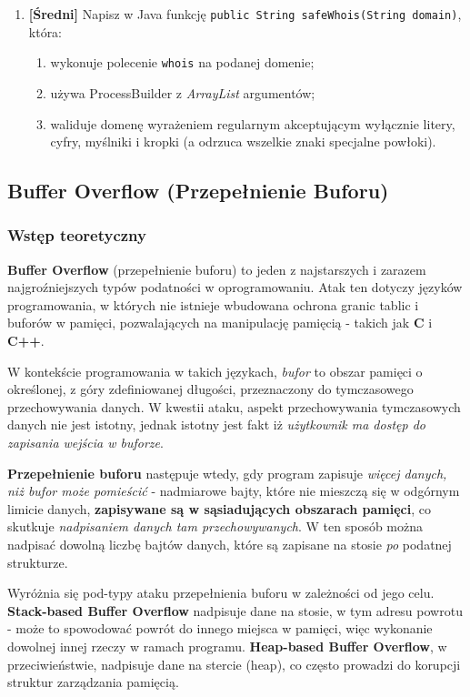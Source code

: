 \documentclass[12pt,a4paper]{article}
\begin{document}
\begin{enumerate}
    \item \textbf{[Średni]} Napisz w Java funkcję
    \texttt{public String safeWhois(String domain)}, która:
    \begin{enumerate}
        \item wykonuje polecenie \texttt{whois} na podanej domenie;
        \item używa ProcessBuilder z \emph{ArrayList} argumentów;
        \item waliduje domenę wyrażeniem regularnym akceptującym wyłącznie litery, cyfry, myślniki i kropki (a odrzuca wszelkie znaki specjalne powłoki).
    \end{enumerate}
 
\end{enumerate}



\subsection{Buffer Overflow (Przepełnienie Buforu)}

\subsubsection{Wstęp teoretyczny}

\textbf{Buffer Overflow} (przepełnienie buforu) to jeden z najstarszych i zarazem najgroźniejszych typów podatności w oprogramowaniu. Atak ten dotyczy języków programowania, w których nie istnieje wbudowana
ochrona granic tablic i buforów w pamięci, pozwalających na manipulację pamięcią - takich jak \textbf{C} i \textbf{C++}.

W kontekście programowania w takich językach, \emph{bufor} to obszar pamięci o określonej, z góry zdefiniowanej długości, przeznaczony do tymczasowego przechowywania danych. W kwestii ataku, aspekt przechowywania
tymczasowych danych nie jest istotny, jednak istotny jest fakt iż \emph{użytkownik ma dostęp do zapisania wejścia w buforze}. 

\textbf{Przepełnienie buforu} następuje wtedy, gdy program zapisuje \emph{więcej danych, niż bufor może pomieścić} - nadmiarowe bajty, które nie mieszczą się w odgórnym limicie danych, 
\textbf{zapisywane są w sąsiadujących obszarach pamięci}, co skutkuje \emph{nadpisaniem danych tam przechowywanych}. W ten sposób można nadpisać dowolną liczbę bajtów danych, które są zapisane na stosie 
\emph{po} podatnej strukturze.

Wyróżnia się pod-typy ataku przepełnienia buforu w zależności od jego celu. \textbf{Stack-based Buffer Overflow} nadpisuje dane na stosie, w tym adresu powrotu - może to spowodować powrót do innego miejsca w pamięci, więc
wykonanie dowolnej innej rzeczy w ramach programu. \textbf{Heap-based Buffer Overflow}, w przeciwieństwie, nadpisuje dane na stercie (heap), co często prowadzi do korupcji struktur zarządzania pamięcią.
\end{document}
